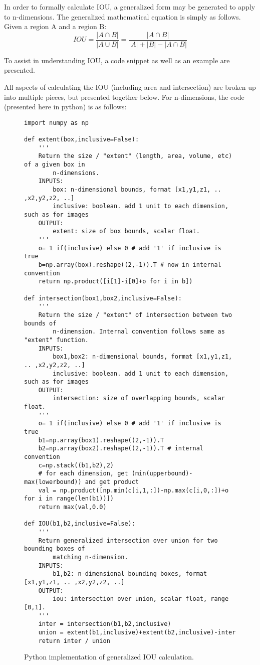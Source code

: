 In order to formally calculate IOU, a generalized form may be generated to apply to n-dimensions. The generalized mathematical equation is simply as follows. Given a region A and a region B: 
\begin{equation}
IOU = \frac{|A\cap B|}{|A\cup B|} = \frac{|A\cap B|}{|A|+|B|- |A\cap B|}
\end{equation}

To assist in understanding IOU, a code snippet as well as an example are presented.

All aspects of calculating the IOU (including area and intersection) are broken up into multiple pieces, but presented together below. For n-dimensions, the code (presented here in python) is as follows: 


\begin{figure}[H]
\begin{lstlisting}
import numpy as np

def extent(box,inclusive=False):
    '''
    Return the size / "extent" (length, area, volume, etc) of a given box in
        n-dimensions.
    INPUTS:
        box: n-dimensional bounds, format [x1,y1,z1, .. ,x2,y2,z2, ..]
        inclusive: boolean. add 1 unit to each dimension, such as for images
    OUTPUT:
        extent: size of box bounds, scalar float.
    '''
    o= 1 if(inclusive) else 0 # add '1' if inclusive is true
    b=np.array(box).reshape((2,-1)).T # now in internal convention
    return np.product([i[1]-i[0]+o for i in b])

def intersection(box1,box2,inclusive=False):
    '''
    Return the size / "extent" of intersection between two bounds of
        n-dimension. Internal convention follows same as "extent" function.
    INPUTS:
        box1,box2: n-dimensional bounds, format [x1,y1,z1, .. ,x2,y2,z2, ..]
        inclusive: boolean. add 1 unit to each dimension, such as for images
    OUTPUT:
        intersection: size of overlapping bounds, scalar float.
    '''
    o= 1 if(inclusive) else 0 # add '1' if inclusive is true
    b1=np.array(box1).reshape((2,-1)).T
    b2=np.array(box2).reshape((2,-1)).T # internal convention
    c=np.stack((b1,b2),2)
    # for each dimension, get (min(upperbound)-max(lowerbound)) and get product
    val = np.product([np.min(c[i,1,:])-np.max(c[i,0,:])+o for i in range(len(b1))])
    return max(val,0.0)

def IOU(b1,b2,inclusive=False):
    '''
    Return generalized intersection over union for two bounding boxes of 
        matching n-dimension.
    INPUTS:
        b1,b2: n-dimensional bounding boxes, format [x1,y1,z1, .. ,x2,y2,z2, ..]
    OUTPUT:
        iou: intersection over union, scalar float, range [0,1].
    '''
    inter = intersection(b1,b2,inclusive)
    union = extent(b1,inclusive)+extent(b2,inclusive)-inter
    return inter / union

\end{lstlisting}
\onehalfspacing %
\caption{Python implementation of generalized IOU calculation.}
\label{code_iou}
\end{figure}

